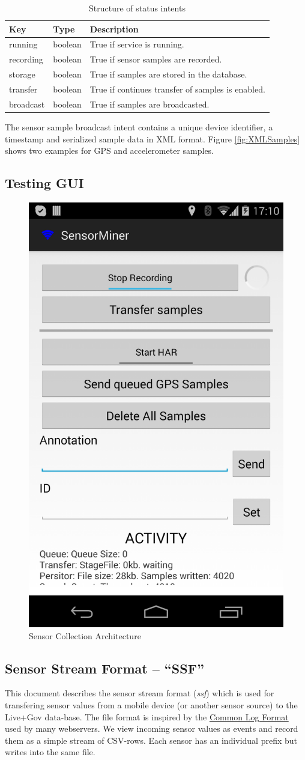 \begin{table}[ht]
\centering
\begin{tabular}{|l|l|l|} \hline
   Key       & Type    & Description                                       \\ \hline
   running   & boolean & True if service is running.                       \\
   recording & boolean & True if sensor samples are recorded.              \\
   storage   & boolean & True if samples are stored in the database.       \\
   transfer  & boolean & True if continues transfer of samples is enabled. \\
   broadcast & boolean & True if samples are broadcasted.                  \\ \hline
\end{tabular}
\caption{Structure of status intents}
\label{tab:StatusIntent}
\end{table}

The sensor sample broadcast intent contains a unique device
identifier, a timestamp and serialized sample data in XML
format. Figure \ref{fig:XMLSamples} shows two examples for GPS and
accelerometer samples.

\subsection{Testing GUI}

\begin{figure}[htbp]
\centering
\includegraphics[width=0.3 \textwidth]{img/sc/sc_gui.png}
\caption{Sensor Collection Architecture}\label{fig:sc_gui}
\end{figure}

\subsection{Sensor Stream Format -- ``SSF''}\label{sec:ssf}
This document describes the sensor stream format ({\it ssf}) which is used for
transfering sensor values from a mobile device (or another sensor
source) to the Live+Gov data-base. The file format is inspired by the
\href{http://en.wikipedia.org/wiki/Common\_Log\_Format}{Common Log
  Format} used by many webservers. We view incoming sensor values as
events and record them as a simple stream of CSV-rows. Each sensor has
an individual prefix but writes into the same file.

